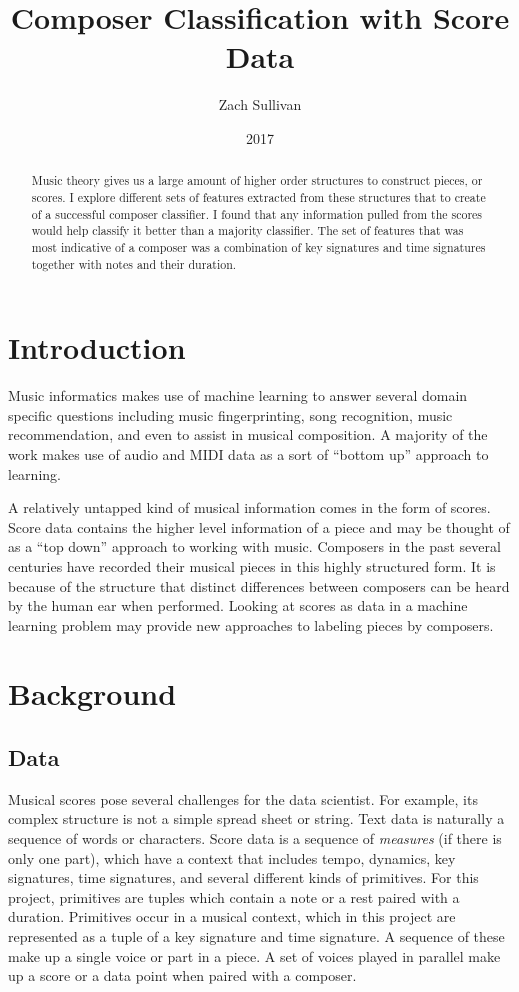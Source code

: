 \documentclass[10pt]{IEEEtran}
\title{Composer Classification with Score Data}
\author{Zach Sullivan}
\date{2017}
\begin{document}
\maketitle

\begin{abstract}
  Music theory gives us a large amount of higher order structures to construct
  pieces, or scores. I explore different sets of features extracted from these
  structures that to create of a successful composer classifier. I found that
  any information pulled from the scores would help classify it better than a
  majority classifier. The set of features that was most indicative of a
  composer was a combination of key signatures and time signatures together with
  notes and their duration.
\end{abstract}

\section{Introduction}
Music informatics makes use of machine learning to answer several domain
specific questions including music fingerprinting, song recognition, music
recommendation, and even to assist in musical composition. A majority of the
work makes use of audio and MIDI data as a sort of ``bottom up'' approach to
learning.

A relatively untapped kind of musical information comes in the form of scores.
Score data contains the higher level information of a piece and may be thought
of as a ``top down'' approach to working with music. Composers in the past
several centuries have recorded their musical pieces in this highly structured
form. It is because of the structure that distinct differences between composers
can be heard by the human ear when performed. Looking at scores as data in a
machine learning problem may provide new approaches to labeling pieces by
composers.

\section{Background}

\subsection{Data}

Musical scores pose several challenges for the data scientist. For example, its
complex structure is not a simple spread sheet or string. Text data is naturally
a sequence of words or characters. Score data is a sequence of {\it measures}
(if there is only one part), which have a context that includes tempo, dynamics,
key signatures, time signatures, and several different kinds of primitives. For
this project, primitives are tuples which contain a note or a rest paired with
a duration. Primitives occur in a musical context, which in this project are
represented as a tuple of a key signature and time signature. A sequence of
these make up a single voice or part in a piece. A set of voices played in
parallel make up a score or a data point when paired with a composer.
\end{document}

